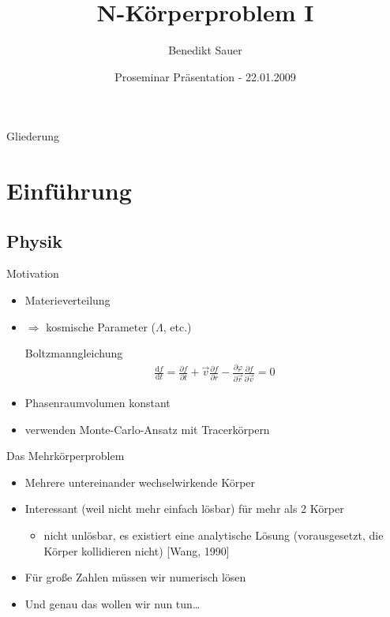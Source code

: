 \documentclass{beamer}
\title[N-Körperproblem I]{N-Körperproblem I}
\author[B. Sauer]{Benedikt Sauer}
\institute{}
\date[Proseminar Präsentation]{Proseminar Präsentation - 22.01.2009}
\begin{document}
\begin{frame}
  \titlepage
\end{frame}

\begin{frame}{Gliederung}
  \tableofcontents[pausesections]
\end{frame}

\section{Einführung}
\subsection{Physik}
\begin{frame}{Motivation}
  \begin{itemize}
    \item Materieverteilung
    \item $\Rightarrow$ kosmische Parameter ($\Lambda$, etc.)
      \pause
      \vskip10pt
    \begin{block}{Boltzmanngleichung}
      \begin{align}
        \frac{\mathrm df}{\mathrm dt} = \frac{\partial f}{\partial t} + \vec v
        \frac{\partial f}{\partial r} - \frac{\partial \varphi}{\partial \vec
        r}\frac{\partial f}{\partial \vec v} = 0
      \end{align}
    \end{block}
      \pause
    \item Phasenraumvolumen konstant
      \pause
    \item verwenden Monte-Carlo-Ansatz mit Tracerkörpern
  \end{itemize}
\end{frame}

\begin{frame}{Das Mehrkörperproblem}
  \begin{itemize}
    \item Mehrere untereinander wechselwirkende Körper
      \pause
    \item Interessant (weil nicht mehr einfach lösbar) für mehr als 2 Körper
      \begin{itemize}
        \item \alert{nicht} unlösbar, es existiert eine analytische Lösung
          (vorausgesetzt, die Körper kollidieren nicht) [Wang, 1990]
      \end{itemize}
      \pause
    \item Für große Zahlen müssen wir numerisch lösen
  \end{itemize}
  \vskip10pt
  \begin{itemize}
    \item Und genau das wollen wir nun tun\ldots
  \end{itemize}
\end{frame}
\end{document}
